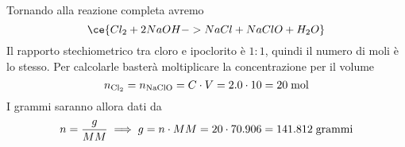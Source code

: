\begin{soluzione}
\begin{equation*}
    \end{equation*}
    Tornando alla reazione completa avremo
    \begin{equation*}
        \ce{Cl_2 + 2NaOH -> NaCl + NaClO + H_2O}
    \end{equation*}
    Il rapporto stechiometrico tra cloro e ipoclorito è $1:1$, quindi il numero di moli è lo stesso. Per calcolarle basterà moltiplicare la concentrazione per il volume
    \begin{equation*}
        n_{\rm Cl_2}=n_{\rm NaClO}=C \cdot V=2.0 \cdot 10=20 \; \rm mol
    \end{equation*}
    I grammi saranno allora dati da
    \begin{equation*}
        n=\frac{g}{MM}
        \implies
        g=n \cdot MM=20 \cdot 70.906=141.812 \; \rm grammi
    \end{equation*}
\end{soluzione}

\newpage

